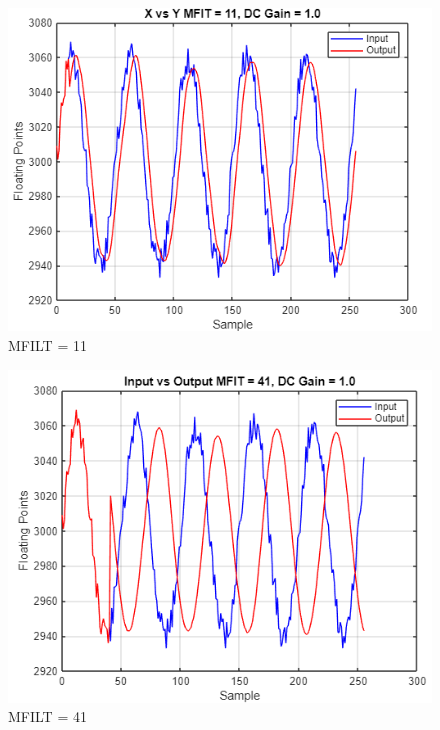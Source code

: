 \documentclass[journal]{IEEEtran}
\begin{document}
\begin{figure}[H]
    \centering
    \includegraphics[width=\linewidth]{4.2.png}
    \caption{MFILT = 11}
    \label{fig:part4B}
\end{figure}

\begin{figure}[H]
    \centering
    \includegraphics[width=\linewidth]{4.3.png}
    \caption{MFILT = 41}
    \label{fig:part4C}
\end{figure}
\end{document}
